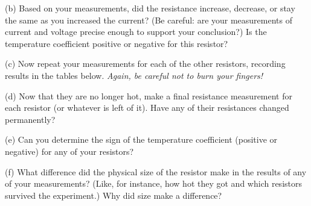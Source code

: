 (b)  Based on your measurements, did the resistance increase, decrease, or stay the same as you increased the current?  (Be careful: are your measurements of current and voltage precise enough to support your conclusion?)  Is the temperature coefficient positive or negative for this resistor? 
\answerspace{1.0in}

\begin{center}
 \par
\end{center}

(c) Now repeat your measurements for each of the other resistors, recording results in the tables below.  \textit{Again, be careful not to burn your fingers!}

\maketableforivmeasurements

\maketableforivmeasurements

\maketableforivmeasurements


(d) Now that they are no longer hot, make a final resistance measurement for each resistor (or whatever is left of it).  Have any of their resistances changed permanently?
\answerspace{1.0in}

(e) Can you determine the sign of the temperature coefficient (positive or negative) for any of your resistors?
\answerspace{1.0in}


(f) What difference did the physical size of the resistor make in the results of any of your measurements?  (Like, for instance, how hot they got and which resistors survived the experiment.)  Why did size make a difference?
\answerspace{1.0in}






